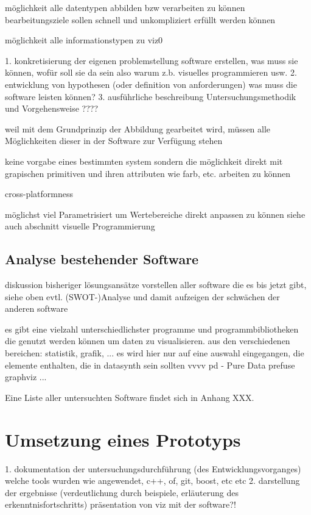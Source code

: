 \documentclass[a4paper, 12pt, DIVcalc, onepage, pdftex, headsepline, footsepline]{scrreprt}
\begin{document}
möglichkeit alle datentypen abbilden bzw verarbeiten zu können
bearbeitungsziele sollen schnell und unkompliziert erfüllt werden können

möglichkeit alle informationstypen zu viz0

1. konkretisierung der eigenen problemstellung
software erstellen, was muss sie können, wofür soll sie da sein
also warum z.b. visuelles programmieren usw.
2. entwicklung von hypothesen (oder definition von anforderungen)
was muss die software leisten können?
3. ausführliche beschreibung Untersuchungsmethodik und Vorgehensweise
????

weil mit dem Grundprinzip der Abbildung gearbeitet wird, müssen alle Möglichkeiten dieser in der Software zur Verfügung stehen

keine vorgabe eines bestimmten system sondern die möglichkeit direkt mit grapischen primitiven und ihren attributen wie farb, etc. arbeiten zu können

cross-platformness

möglichst viel Parametrisiert um Wertebereiche direkt anpassen zu können
siehe auch abschnitt visuelle Programmierung










\section{Analyse bestehender Software}
\label{sec:bestehendeSoftware}
diskussion bisheriger lösungsansätze
vorstellen aller software die es bis jetzt gibt, siehe oben
evtl. (SWOT-)Analyse und damit aufzeigen der schwächen der anderen software

es gibt eine vielzahl unterschiedlichster programme und programmbibliotheken die genutzt werden können um daten zu visualisieren.
aus den verschiedenen bereichen: statistik, grafik, ...
es wird hier nur auf eine auswahl eingegangen, die elemente enthalten, die in datasynth sein sollten
vvvv
pd - Pure Data
prefuse
graphviz
...

Eine Liste aller untersuchten Software findet sich in Anhang XXX.



\chapter{Umsetzung eines Prototyps}
\label{cha:Umsetzung}
1. dokumentation der untersuchungsdurchführung (des Entwicklungsvorganges)
welche tools wurden wie angewendet, c++, of, git, boost, etc etc
2. darstellung der ergebnisse (verdeutlichung durch beispiele, erläuterung des erkenntnisfortschritts)
präsentation von viz mit der software?!
\end{document}
